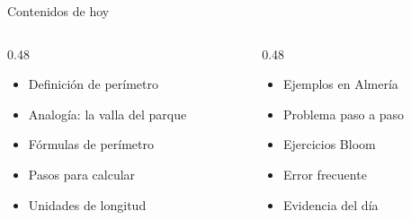 \documentclass[aspectratio=169, 10pt, spanish]{beamer}
\begin{document}
\begin{frame}[plain]
  \titlepage
\end{frame}

\begin{frame}{Contenidos de hoy}
  \begin{columns}[t]
    \begin{column}{0.48\textwidth}
      \begin{itemize}
        \item Definición de perímetro
        \item Analogía: la valla del parque
        \item Fórmulas de perímetro
        \item Pasos para calcular
        \item Unidades de longitud
      \end{itemize}
    \end{column}
    \begin{column}{0.48\textwidth}
      \begin{itemize}
        \item Ejemplos en Almería
        \item Problema paso a paso
        \item Ejercicios Bloom
        \item Error frecuente
        \item Evidencia del día
      \end{itemize}
    \end{column}
  \end{columns}
  \vspace{0.4cm}
  \begin{notabox}
    \quad
    \quad
  \end{notabox}
\end{frame}

\end{document}
